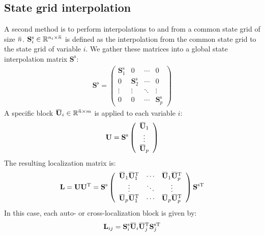 \documentclass[12pt]{scrartcl}
\newcommand{\overbar}[1]{\mkern 1.5mu\overline{\mkern-1.5mu#1\mkern-1.5mu}\mkern 1.5mu}
\begin{document}
\subsection{State grid interpolation}
A second method is to perform interpolations to and from a common state grid of size $\overbar{n}$. $\mathbf{S}^\mathrm{s}_i \in \mathbb{R}^{n_i \times \overbar{n}}$ is defined as the interpolation from the common state grid to the state grid of variable $i$. We gather these matrices into a global state interpolation matrix $\mathbf{S}^\mathrm{s}$:
\begin{align}
\mathbf{S}^\mathrm{s} = \left( \begin{array}{cccc}
\mathbf{S}^\mathrm{s}_1 & 0 & \cdots & 0 \\
0 & \mathbf{S}^\mathrm{s}_2 & \cdots & 0 \\
\vdots & \vdots & \ddots & \vdots \\
0 & 0 & \cdots & \mathbf{S}^\mathrm{s}_p
\end{array} \right)
\end{align}
A specific block $\overbar{\mathbf{U}}_i \in \mathbb{R}^{\overbar{n} \times m}$ is applied to each variable $i$:
\begin{align}
\mathbf{U} = \mathbf{S}^\mathrm{s} \left( \begin{array}{c}
\overbar{\mathbf{U}}_1 \\
\vdots \\
\overbar{\mathbf{U}}_p
\end{array} \right)
\end{align}
The resulting localization matrix is:
\begin{align}
\mathbf{L} = \mathbf{U} \mathbf{U}^\mathrm{T} = \mathbf{S}^\mathrm{s} \left( \begin{array}{ccc}
\overbar{\mathbf{U}}_1 \overbar{\mathbf{U}}_1^\mathrm{T} & \cdots & \overbar{\mathbf{U}}_1 \overbar{\mathbf{U}}_p^\mathrm{T} \\
\vdots & \ddots & \vdots  \\
\overbar{\mathbf{U}}_p \overbar{\mathbf{U}}_1^\mathrm{T} & \cdots & \overbar{\mathbf{U}}_p \overbar{\mathbf{U}}_p^\mathrm{T}
\end{array} \right) \mathbf{S}^{\mathrm{s} \mathrm{T}}
\end{align}
In this case, each auto- or cross-localization block is given by: 
\begin{align}
\mathbf{L}_{ij} = \mathbf{S}^\mathrm{s}_i \overbar{\mathbf{U}}_i \overbar{\mathbf{U}}_j^\mathrm{T} \mathbf{S}_j^{\mathrm{s} \mathrm{T}}
\end{align}
\end{document}
